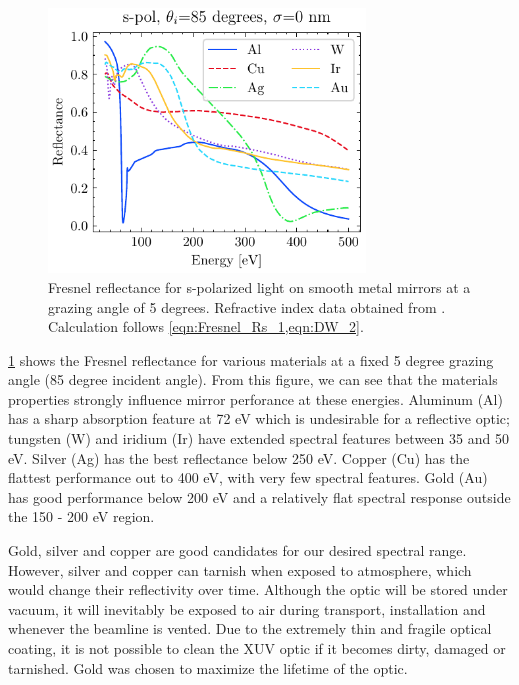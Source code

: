 \begin{figure}
	\centering
	\includegraphics[width=0.75\textwidth]{figures/chap2/Fresnel_NoSigma.pdf}
	\caption{Fresnel reflectance for s-polarized light on smooth metal mirrors at a grazing angle of 5 degrees. Refractive index data obtained from \cite{gulliksonCXROXRayInteractions,henkeXRayInteractionsPhotoabsorption1993}. Calculation follows \cref{eqn:Fresnel_Rs_1,eqn:DW_2}.}
	\label{fig:Mirror_Material_Choice}
\end{figure}


\cref{fig:Mirror_Material_Choice} shows the Fresnel reflectance for various materials at a fixed 5 degree grazing angle (85 degree incident angle). From this figure, we can see that the materials properties strongly influence mirror perforance at these energies. Aluminum (Al) has a sharp absorption feature at 72 eV which is undesirable for a reflective optic; tungsten (W) and iridium (Ir) have extended spectral features between 35 and 50 eV. Silver (Ag) has the best reflectance below 250 eV. Copper (Cu) has the flattest performance out to 400 eV, with very few spectral features. Gold (Au) has good performance below 200 eV and a relatively flat spectral response outside the 150 - 200 eV region. 

Gold, silver and copper are good candidates for our desired spectral range. However, silver and copper can tarnish when exposed to atmosphere, which would change their reflectivity over time. Although the optic will be stored under vacuum, it will inevitably be exposed to air during transport, installation and whenever the beamline is vented. Due to the extremely thin and fragile optical coating, it is not possible to clean the XUV optic if it becomes dirty, damaged or tarnished. Gold was chosen to maximize the lifetime of the optic.

